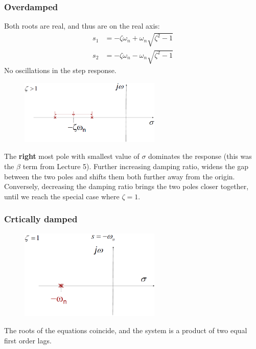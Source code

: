 \documentclass[class=report, crop=false, 12pt,a4paper]{standalone}
\begin{document}
\subsubsection{Overdamped}
Both roots are real, and thus are on the real axis:
\begin{align}
  s_1 &= -\zeta \omega_n + \omega_n \sqrt{\zeta^2 - 1}\\
  s_2 &= -\zeta \omega_n - \omega_n \sqrt{\zeta^2 - 1}
\end{align}
No oscillations in the step response.
\begin{figure}[H]
  \centerline{\includegraphics[width = 0.6\textwidth]{../img/diagram94.png}}
  \caption{}
\end{figure}
The \textbf{right} most pole with smallest value of $\sigma$ dominates the response (this was the $\beta$ term from Lecture 5). Further increasing damping ratio, widens the gap between the two poles and shifts them both further away from the origin. Conversely, decreasing the damping ratio brings the two poles closer together, until we reach the special case where $\zeta = 1$.
\subsubsection{Crtically damped}
\begin{figure}[H]
  \centerline{\includegraphics[width = 0.6\textwidth]{../img/diagram95.png}}
  \caption{}
\end{figure}
The roots of the equations coincide, and the system is a product of two equal first order lags.
\end{document}

